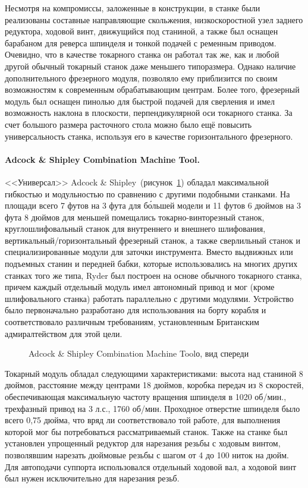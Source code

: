 Несмотря на компромиссы, заложенные в конструкции, в станке были реализованы составные направляющие скольжения, низкоскоростной узел заднего редуктора, ходовой винт, движущийся под станиной, а также был оснащен барабаном для реверса шпинделя и тонкой подачей с ременным приводом. Очевидно, что в качестве токарного станка он работал так же, как и любой другой обычный токарный станок даже меньшего типоразмера. Однако наличие дополнительного фрезерного модуля, позволяло ему приблизится по своим возможностям к современным обрабатывающим центрам. Более того, фрезерный модуль был оснащен пинолью для быстрой подачей для сверления и имел возможность наклона в плоскости, перпендикулярной оси токарного станка. За счет большого размера расточного стола можно было ещё повысить универсальность станка, используя его в качестве горизонтального фрезерного.

\paragraph{Adcock \& Shipley Combination Machine Tool.}

<<Универсал>> Adcock \& Shipley~(рисунок~\cref{fig:adcock-1}) обладал максимальной гибкостью и модульностью по сравнению с другими подобными станками. На площади всего 7 футов на 3 фута для б\'ольшей модели и 11 футов 6 дюймов на 3 фута 8 дюймов для меньшей помещались токарно-винторезный станок, круглошлифовальный станок для внутреннего и внешнего шлифования, вертикальный/горизонтальный фрезерный станок, а также сверлильный станок и специализированные модули для заточки инструмента. Вместо выдвижных или подъемных станин и передней бабки, которые использовались на многих других станках того же типа, Ryder был построен на основе обычного токарного станка, причем каждый отдельный модуль имел автономный привод и мог (кроме шлифовального станка) работать параллельно с другими модулями. Устройство было первоначально разработано для использования на борту корабля и соответствовало различным требованиям, установленным Британским адмиралтейством для этой цели. 

\begin{figure}[ht]
	\caption{Adcock \& Shipley Combination Machine Toolо, вид спереди}\label{fig:adcock-1}
\end{figure}

Токарный модуль обладал следующими характеристиками: высота над станиной 8 дюймов, расстояние между центрами 18 дюймов, коробка передач из 8 скоростей, обеспечивающая максимальную частоту вращения шпинделя в 1020 об/мин., трехфазный привод на 3 л.с., 1760 об/мин. Проходное отверстие шпинделя было всего 0,75 дюйма, что вряд ли соответствовало той работе, для выполнения которой мог бы потребоваться рассматриваемый станок. Также на станке был установлен упрощенный редуктор для нарезания резьбы с ходовым винтом, позволявшим нарезать дюймовые резьбы с шагом от 4 до 100 ниток на дюйм. Для автоподачи суппорта использовался отдельный ходовой вал, а ходовой винт был нужен исключительно для нарезания резьб.

